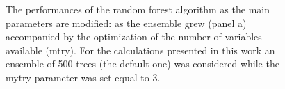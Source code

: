 \documentclass[
12pt, %
a4paper, %
oneside, %
headinclude,footinclude, %
BCOR5mm, %
]{scrartcl}
\begin{document}
\begin{figure}[h]
  \centering
{}
\caption{The performances of the random forest algorithm as the main parameters are modified: as the ensemble grew (panel a) accompanied by the optimization of the number of variables available (mtry). For the calculations presented in this work an ensemble of 500 trees (the default one) was considered while the mytry parameter was set equal to 3.}
\label{Random_forest_tree_perfs}
\end{figure}
\end{document}
